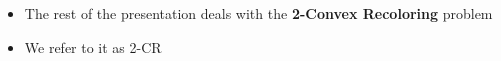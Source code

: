 \begin{frame}
\begin{itemize}
	
\item
The rest of the presentation deals with the \textbf{2-Convex Recoloring} problem

\pause\item
We refer to it as \alert{2-CR}
	
\end{itemize}
\end{frame}